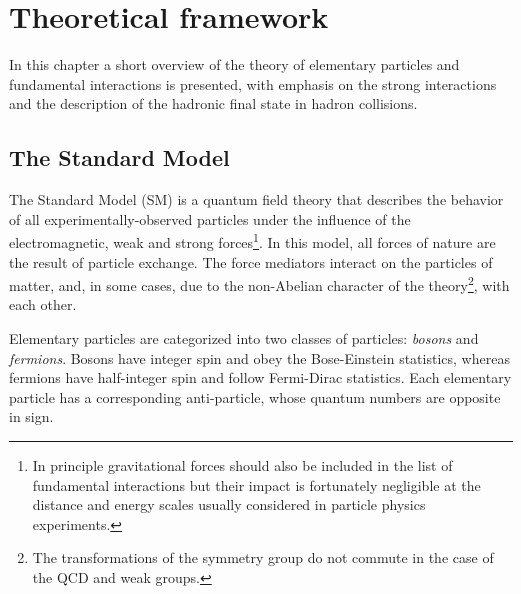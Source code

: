 %
%
\chapter{Theoretical framework}\label{ch:theory}

In this chapter a short overview of the theory of elementary particles and fundamental interactions is presented, with emphasis on the strong interactions and the description of the hadronic final state in hadron collisions.

\section{The Standard Model}\label{sec:qcdintro}

The Standard Model (SM) is a quantum field theory that describes the behavior of all experimentally-observed particles under the influence of the electromagnetic, weak and strong forces\footnote{In principle gravitational forces should also be included in the list of fundamental interactions but their impact is  fortunately negligible at the distance and energy scales usually considered in particle physics experiments.}. In this model, all forces of nature are the result of particle exchange. The force mediators interact on the particles of matter, and, in some cases, due to the non-Abelian character of the theory\footnote{The transformations of the symmetry group do not commute in the case of the QCD and weak groups.}, with each other.

Elementary particles are categorized into two classes of particles: \emph{bosons} and \emph{fermions}. Bosons have integer spin and obey the Bose-Einstein statistics, whereas fermions have half-integer spin and follow Fermi-Dirac statistics.  Each elementary particle has a corresponding anti-particle, whose quantum numbers are opposite in sign.

